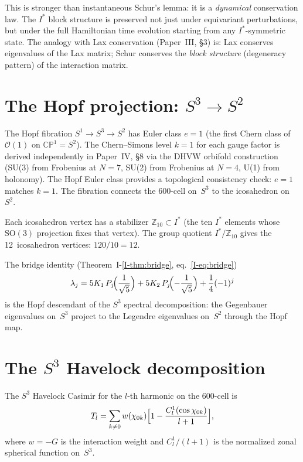 This is stronger than instantaneous Schur's lemma: it is a
\emph{dynamical} conservation law.  The $I^*$ block structure is
preserved not just under equivariant perturbations, but under
the full Hamiltonian time evolution starting from any $I^*$-symmetric
state.  The analogy with Lax conservation (Paper~III, \S3) is:
Lax conserves eigenvalues of the Lax matrix; Schur conserves the
\emph{block structure} (degeneracy pattern) of the interaction matrix.

\section{The Hopf projection: $S^3 \to S^2$}
\label{sec:hopf}

The Hopf fibration $S^1 \to S^3 \to S^2$ has Euler class $e = 1$
(the first Chern class of $\mathcal{O}(1)$ on $\mathbb{CP}^1 = S^2$).
The Chern--Simons level $k = 1$ for each gauge factor is derived
independently in Paper~IV, \S8 via the DHVW orbifold construction
(SU(3) from Frobenius at $N=7$, SU(2) from Frobenius at $N=4$,
U(1) from holonomy).  The Hopf Euler class provides a topological
consistency check: $e = 1$ matches $k = 1$.
The fibration connects the 600-cell on~$S^3$ to the icosahedron
on~$S^2$.

Each icosahedron vertex has a stabilizer $\mathbb{Z}_{10} \subset I^*$
(the ten $I^*$ elements whose $\mathrm{SO}(3)$ projection fixes that
vertex).  The group quotient $I^*/\mathbb{Z}_{10}$ gives the
12~icosahedron vertices: $120/10 = 12$.

The bridge identity
(Theorem~I-\ref{I-thm:bridge}, eq.~\eqref{I-eq:bridge})
\[
  \lambda_j = 5K_1\, P_j\!\Bigl(\frac{1}{\sqrt{5}}\Bigr)
            + 5K_2\, P_j\!\Bigl(-\frac{1}{\sqrt{5}}\Bigr)
            + \frac{1}{4}(-1)^j
\]
is the Hopf descendant of the $S^3$ spectral decomposition:
the Gegenbauer eigenvalues on~$S^3$ project to the Legendre
eigenvalues on~$S^2$ through the Hopf map.

\section{The $S^3$ Havelock decomposition}
\label{sec:s3-havelock}

The $S^3$ Havelock Casimir for the $l$-th harmonic on the 600-cell is
\begin{equation}\label{eq:s3-havelock}
  T_l = \sum_{k \neq 0} w(\chi_{0k})
  \Bigl[1 - \frac{C_l^1(\cos\chi_{0k})}{l+1}\Bigr],
\end{equation}
where $w = -G$ is the interaction weight and $C_l^1/(l+1)$ is the
normalized zonal spherical function on~$S^3$.

